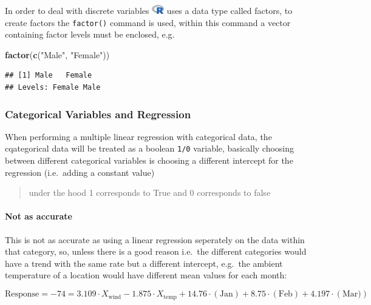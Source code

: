 \documentclass[]{book}
\newenvironment{Shaded}{\begin{snugshade}}{\end{snugshade}}
\newcommand{\KeywordTok}[1]{\textcolor[rgb]{0.13,0.29,0.53}{\textbf{#1}}}
\newcommand{\NormalTok}[1]{#1}
\newcommand{\StringTok}[1]{\textcolor[rgb]{0.31,0.60,0.02}{#1}}
\let\oldparagraph\paragraph
\renewcommand{\paragraph}[1]{\oldparagraph{#1}\mbox{}}
\begin{document}
In order to deal with discrete variables \includegraphics{images/Ricon20px.png} uses a data type called factors, to create factors the \texttt{factor()} command is used, within this command a vector containing factor levels must be enclosed, e.g.~

\begin{Shaded}
\begin{Highlighting}[]
\KeywordTok{factor}\NormalTok{(}\KeywordTok{c}\NormalTok{(}\StringTok{"Male"}\NormalTok{, }\StringTok{"Female"}\NormalTok{))}
\end{Highlighting}
\end{Shaded}

\begin{verbatim}
## [1] Male   Female
## Levels: Female Male
\end{verbatim}

\hypertarget{categorical-variables-and-regression}{%
\subsubsection{Categorical Variables and Regression}\label{categorical-variables-and-regression}}

When performing a multiple linear regression with categorical data, the cqategorical data will be treated as a boolean \texttt{1/0} variable, basically choosing between different categorical variables is choosing a different intercept for the regression (i.e.~adding a constant value)

\begin{quote}
under the hood 1 corresponds to True and 0 corresponds to false
\end{quote}

\hypertarget{not-as-accurate}{%
\paragraph{Not as accurate}\label{not-as-accurate}}

This is not as accurate as using a linear regression seperately on the data within that category, so, unless there is a good reason i.e.~the different categories would have a trend with the same rate but a different intercept, e.g.~the ambient temperature of a location would have different mean values for each month:

\[
\text{Response} = -74 = 3.109 \cdot X_{\text{wind}} - 1.875\cdot X_{\text{temp}} + 14.76 \cdot \left( \text{Jan} \right) + 8.75 \cdot \left( \text{Feb} \right) +4.197 \cdot \left( \text{Mar}) \right) 
\]
\end{document}
